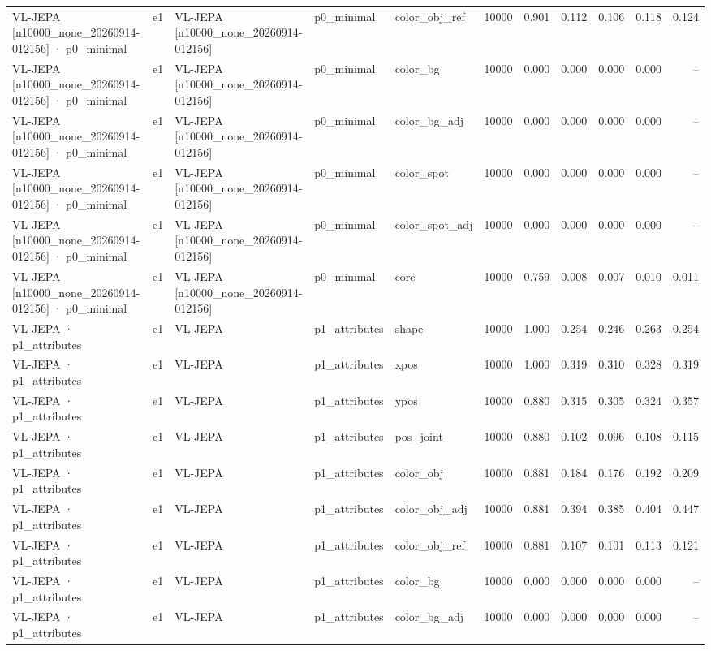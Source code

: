 \begin{tabular}{lllllrrrrrr}
VL-JEPA [n10000\_none\_20260914-012156] · p0\_minimal & e1 & VL-JEPA [n10000\_none\_20260914-012156] & p0\_minimal & color\_obj\_ref & 10000 & 0.901 & 0.112 & 0.106 & 0.118 & 0.124 \\
VL-JEPA [n10000\_none\_20260914-012156] · p0\_minimal & e1 & VL-JEPA [n10000\_none\_20260914-012156] & p0\_minimal & color\_bg & 10000 & 0.000 & 0.000 & 0.000 & 0.000 & -- \\
VL-JEPA [n10000\_none\_20260914-012156] · p0\_minimal & e1 & VL-JEPA [n10000\_none\_20260914-012156] & p0\_minimal & color\_bg\_adj & 10000 & 0.000 & 0.000 & 0.000 & 0.000 & -- \\
VL-JEPA [n10000\_none\_20260914-012156] · p0\_minimal & e1 & VL-JEPA [n10000\_none\_20260914-012156] & p0\_minimal & color\_spot & 10000 & 0.000 & 0.000 & 0.000 & 0.000 & -- \\
VL-JEPA [n10000\_none\_20260914-012156] · p0\_minimal & e1 & VL-JEPA [n10000\_none\_20260914-012156] & p0\_minimal & color\_spot\_adj & 10000 & 0.000 & 0.000 & 0.000 & 0.000 & -- \\
VL-JEPA [n10000\_none\_20260914-012156] · p0\_minimal & e1 & VL-JEPA [n10000\_none\_20260914-012156] & p0\_minimal & core & 10000 & 0.759 & 0.008 & 0.007 & 0.010 & 0.011 \\
VL-JEPA · p1\_attributes & e1 & VL-JEPA & p1\_attributes & shape & 10000 & 1.000 & 0.254 & 0.246 & 0.263 & 0.254 \\
VL-JEPA · p1\_attributes & e1 & VL-JEPA & p1\_attributes & xpos & 10000 & 1.000 & 0.319 & 0.310 & 0.328 & 0.319 \\
VL-JEPA · p1\_attributes & e1 & VL-JEPA & p1\_attributes & ypos & 10000 & 0.880 & 0.315 & 0.305 & 0.324 & 0.357 \\
VL-JEPA · p1\_attributes & e1 & VL-JEPA & p1\_attributes & pos\_joint & 10000 & 0.880 & 0.102 & 0.096 & 0.108 & 0.115 \\
VL-JEPA · p1\_attributes & e1 & VL-JEPA & p1\_attributes & color\_obj & 10000 & 0.881 & 0.184 & 0.176 & 0.192 & 0.209 \\
VL-JEPA · p1\_attributes & e1 & VL-JEPA & p1\_attributes & color\_obj\_adj & 10000 & 0.881 & 0.394 & 0.385 & 0.404 & 0.447 \\
VL-JEPA · p1\_attributes & e1 & VL-JEPA & p1\_attributes & color\_obj\_ref & 10000 & 0.881 & 0.107 & 0.101 & 0.113 & 0.121 \\
VL-JEPA · p1\_attributes & e1 & VL-JEPA & p1\_attributes & color\_bg & 10000 & 0.000 & 0.000 & 0.000 & 0.000 & -- \\
VL-JEPA · p1\_attributes & e1 & VL-JEPA & p1\_attributes & color\_bg\_adj & 10000 & 0.000 & 0.000 & 0.000 & 0.000 & -- \\

\end{tabular}
